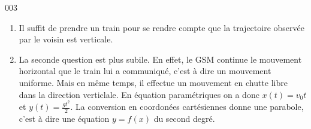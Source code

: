 \begin{corrige}{003}
\begin{enumerate}
\item Il suffit de prendre un train pour se rendre compte que la trajectoire observée par le voisin est verticale.
\item La seconde question est plus subile. En effet, le GSM continue le mouvement horizontal que le train lui a communiqué, c'est à dire un mouvement uniforme. Mais en même temps, il effectue un mouvement en chutte libre dans la direction verticlale. En équation paramétriques on a donc $x(t)=v_0t$ et $y(t)=\frac{gt^2}{2}$. La conversion en coordonées cartésiennes donne une parabole, c'est à dire une équation $y=f(x)$ du second degré.
\end{enumerate}
\end{corrige}


